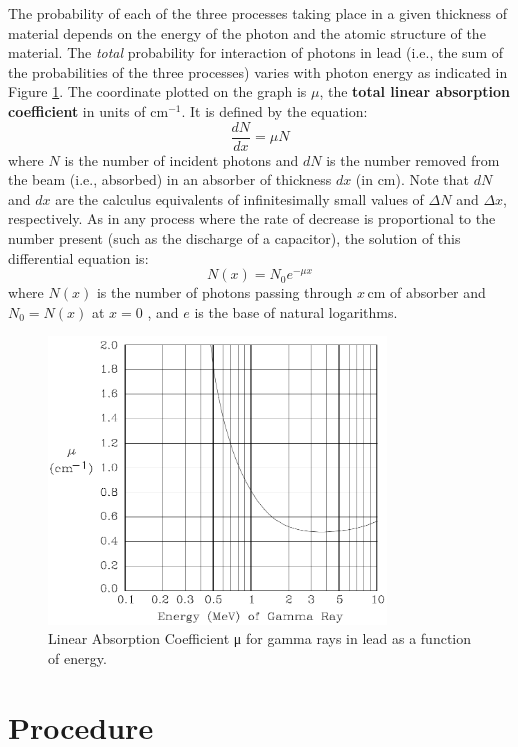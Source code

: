 The probability of each of the three processes taking place in a given thickness of material depends on the energy of the photon and the atomic structure of the material. The \emph{total} probability for interaction of photons in lead (i.e., the sum of the probabilities of the three processes) varies with photon energy as indicated in Figure {\ref{fig:linear}}. The coordinate plotted on the graph is $\mu$, the \textbf{total linear absorption coefficient} in units of $\mathrm{cm}^{-1}$. It is defined by the equation:
\begin{equation}
  \frac{d N}{d x}=\mu N
\end{equation}
where $N$ is the number of incident photons and $dN$ is the number removed from the beam (i.e., absorbed) in an absorber of thickness $dx$ (in cm). Note that $dN$ and $dx$ are the calculus equivalents of infinitesimally small values of $\Delta N$ and $\Delta x$, respectively. As in any process where the rate of decrease is proportional to the number present (such as the discharge of a capacitor), the solution of this differential equation is:
\begin{equation}
  N(x)=N_{0}e^{-\mu x}
\label{eq:nx}
\end{equation}
where $N(x)$ is the number of photons passing through $x\,\mathrm{cm}$ of absorber and $N_0=N(x)$ at $x = 0$ , and $e$ is the base of natural logarithms.
\begin{figure}[h]
\centering
\includegraphics[width=0.8\textwidth]{./Exp10/pic/image6.png}
\caption{Linear Absorption Coefficient μ for gamma rays in lead as a function of energy.}
\label{fig:linear}
\end{figure}

\section{Procedure}
